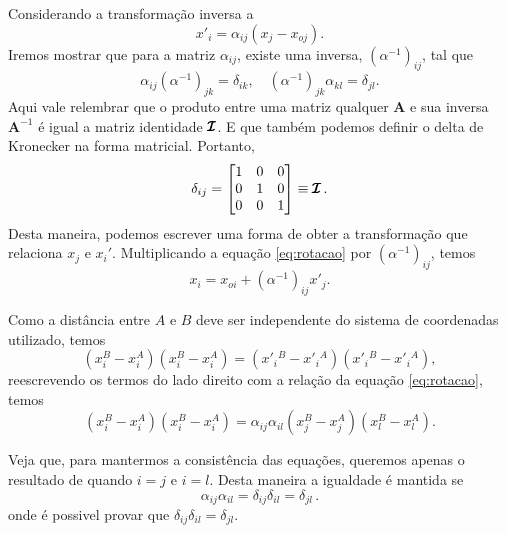 Considerando a transforma\c{c}\~ao inversa a
\begin{equation}
x'_{i}=\alpha_{ij}(x_{j}-x_{oj}).
  \label{eq:rotacao}
\end{equation}
Iremos mostrar que para a matriz $\alpha_{ij}$, existe uma inversa,
$(\alpha^{-1})_{ij}$, tal que
\begin{equation}
\alpha_{ij}(\alpha^{-1})_{jk}=\delta_{ik}, \quad (\alpha^{-1})_{jk}\alpha_{kl}=\delta_{jl}.
\label{eq:inversakronecker}
\end{equation}
Aqui vale relembrar que o produto entre uma matriz qualquer $\pmb{A}$ e sua inversa
$\pmb{A}^{-1}$ \'e igual a matriz identidade $\pmb{\cal{I}}$. E que tamb\'em
podemos definir o delta de Kronecker na forma matricial. Portanto,
\begin{equation}
  \delta_{ij} =
  \begin{bmatrix}
    1 & 0 & 0 \\
    0 & 1 & 0 \\
    0 & 0 & 1 
  \end{bmatrix}
  \equiv \pmb{\cal{I}}
  \, .
\end{equation}
Desta maneira, podemos escrever uma forma de obter a transforma\c{c}\~ao que
relaciona $x_j$ e $x_i'$. Multiplicando a equa\c{c}\~ao \ref{eq:rotacao} por
$(\alpha^{-1})_{ij}$, temos
\begin{equation}
x_{i}=x_{oi}+(\alpha^{-1})_{ij}x'_{j}.
\end{equation}

Como a dist\^ancia entre $A$ e $B$ deve ser independente do
sistema de coordenadas utilizado, temos
\begin{equation}
 (x_{i}^{B}-x_{i}^{A})(x_{i}^{B}-x_{i}^{A})=(x'_i{}^{B}-x'_i{}^{A})(x'_i{}^{B}-x'_i{}^{A}),
\end{equation}
reescrevendo os termos do lado direito com a rela\c{c}\~ao da equa\c{c}\~ao \ref{eq:rotacao},
temos
\begin{equation}
 (x_{i}^{B}-x_{i}^{A})(x_{i}^{B}-x_{i}^{A})=\alpha_{ij}\alpha_{il}(x_{j}^{B}-x_{j}^{A})(x_{l}^{B}-x_{l}^{A}).
\end{equation}

Veja que, para mantermos a consist\^encia das equa\c{c}\~oes, 
queremos apenas o resultado de quando $i=j$ e $i=l$. Desta maneira
a igualdade \'e mantida se
\begin{equation}
  \alpha_{ij}\alpha_{il}=\delta_{ij}\delta_{il} = \delta_{jl} \, .
\end{equation}
onde \'e possivel provar que $\delta_{ij}\delta_{il} = \delta_{jl}$.

